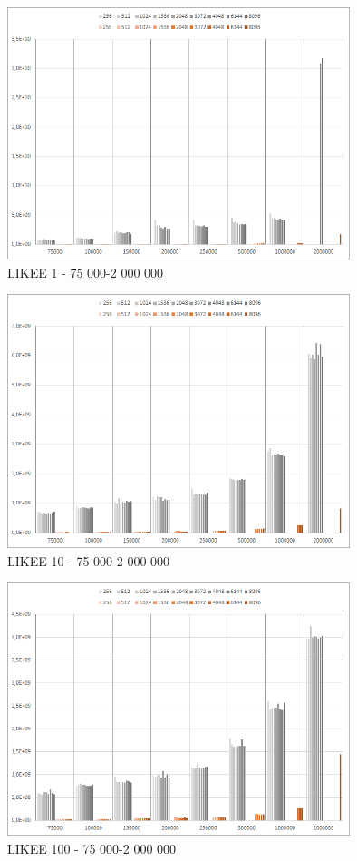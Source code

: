 \documentclass[a4paper, 11pt]{article}
\begin{document}
\begin{figure}[H]
\centering
\includegraphics[width=100mm]{images/f1-75k-2kk.png}
\caption{LIKEE 1 - 75 000-2 000 000}
\end{figure}
\begin{figure}[H]
\centering
\includegraphics[width=100mm]{images/f10-75k-2kk.png}
\caption{LIKEE 10 - 75 000-2 000 000}
\end{figure}
\begin{figure}[H]
\centering
\includegraphics[width=100mm]{images/f100-75k-2kk.png}
\caption{LIKEE 100 - 75 000-2 000 000}
\end{figure} 
\end{document}
